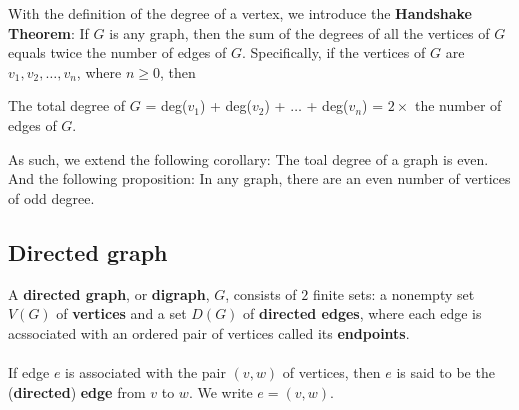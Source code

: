 \documentclass[a4paper]{article}
\begin{document}
With the definition of the degree of a vertex, we introduce the \textbf{Handshake Theorem}: If $G$ is any graph, then the sum of the degrees of all the vertices of $G$ equals twice the number of edges of $G$. Specifically, if the vertices of $G$ are $v_1, v_2, \dots, v_n$, where $n\ge 0$, then
\begin{center}
	The total degree of $G$ = deg($v_1$) + deg($v_2$) + $\dots$ + deg($v_n$) = $2 \times$ the number of edges of $G$.
\end{center}
As such, we extend the following corollary: The toal degree of a graph is even.\\
And the following proposition: In any graph, there are an even number of vertices of odd degree.

\subsection{Directed graph}
A \textbf{directed graph}, or \textbf{digraph}, $G$, consists of $2$ finite sets: a nonempty set $V(G)$ of \textbf{vertices} and a set $D(G)$ of \textbf{directed edges}, where each edge is acssociated with an ordered pair of vertices called its \textbf{endpoints}.\\\\
If edge $e$ is associated with the pair $(v,w)$ of vertices, then $e$ is said to be the (\textbf{directed}) \textbf{edge} from $v$ to $w$. We write $e=(v,w)$.
\end{document}
